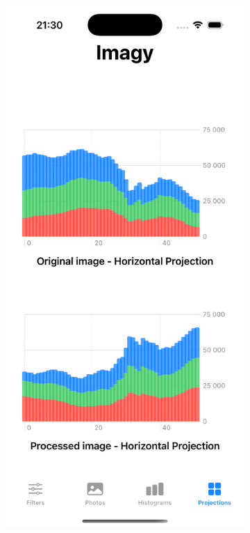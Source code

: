 \documentclass[a4paper]{article}
\begin{document}
\begin{figure}[H]
    \centering
    \begin{subfigure}{0.2\textwidth}
        \centering
        \includegraphics[width=\linewidth]{images/rzuty_horizontal.png}

\end{subfigure}
\end{figure}
\end{document}
